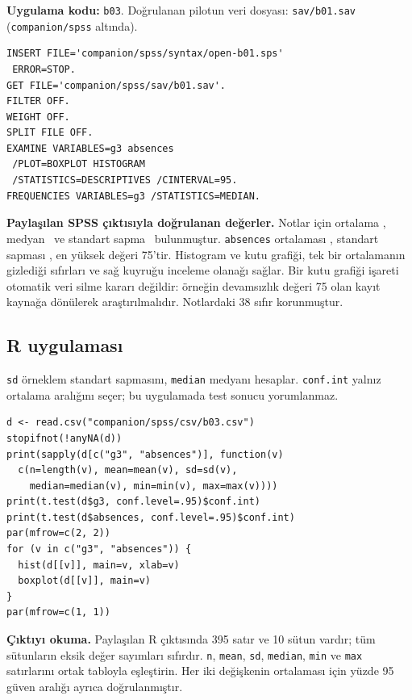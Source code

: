 \par\noindent\begin{minipage}{\linewidth}
\textbf{Uygulama kodu:} \texttt{b03}. Doğrulanan pilotun veri dosyası:
\texttt{sav/b01.sav} (\texttt{companion/spss} altında).

\begin{lstlisting}[style=prismSPSS]
INSERT FILE='companion/spss/syntax/open-b01.sps'
 ERROR=STOP.
GET FILE='companion/spss/sav/b01.sav'.
FILTER OFF.
WEIGHT OFF.
SPLIT FILE OFF.
EXAMINE VARIABLES=g3 absences
 /PLOT=BOXPLOT HISTOGRAM
 /STATISTICS=DESCRIPTIVES /CINTERVAL=95.
FREQUENCIES VARIABLES=g3 /STATISTICS=MEDIAN.
\end{lstlisting}

\end{minipage}\par

\begin{outputguidebox}
\textbf{Paylaşılan SPSS çıktısıyla doğrulanan değerler.}
Notlar için ortalama \SPMatMean, medyan \SPMatMedian\ ve standart sapma
\SPMatSD\ bulunmuştur. \texttt{absences} ortalaması \SPAbsMean, standart sapması
\SPAbsSD, en yüksek değeri 75'tir. Histogram ve kutu grafiği, tek bir
ortalamanın gizlediği sıfırları ve sağ kuyruğu inceleme olanağı sağlar.
Bir kutu grafiği işareti otomatik veri silme kararı değildir: örneğin
devamsızlık değeri 75 olan kayıt kaynağa dönülerek araştırılmalıdır.
Notlardaki 38 sıfır korunmuştur.
\end{outputguidebox}


\par\noindent\begin{minipage}{\linewidth}
\subsection{R uygulaması}
\label{sec:r-gercek-b03}

\texttt{sd} örneklem standart sapmasını, \texttt{median} medyanı hesaplar. \texttt{conf.int} yalnız ortalama aralığını seçer; bu uygulamada test sonucu yorumlanmaz.

\begin{lstlisting}[style=prismR]
d <- read.csv("companion/spss/csv/b03.csv")
stopifnot(!anyNA(d))
print(sapply(d[c("g3", "absences")], function(v)
  c(n=length(v), mean=mean(v), sd=sd(v),
    median=median(v), min=min(v), max=max(v))))
print(t.test(d$g3, conf.level=.95)$conf.int)
print(t.test(d$absences, conf.level=.95)$conf.int)
par(mfrow=c(2, 2))
for (v in c("g3", "absences")) {
  hist(d[[v]], main=v, xlab=v)
  boxplot(d[[v]], main=v)
}
par(mfrow=c(1, 1))
\end{lstlisting}

\textbf{Çıktıyı okuma.} Paylaşılan R çıktısında 395 satır ve 10 sütun
vardır; tüm sütunların eksik değer sayımları sıfırdır. \texttt{n},
\texttt{mean}, \texttt{sd}, \texttt{median}, \texttt{min} ve
\texttt{max} satırlarını ortak tabloyla eşleştirin. Her iki değişkenin
ortalaması için yüzde 95 güven aralığı ayrıca doğrulanmıştır.
\end{minipage}\par

